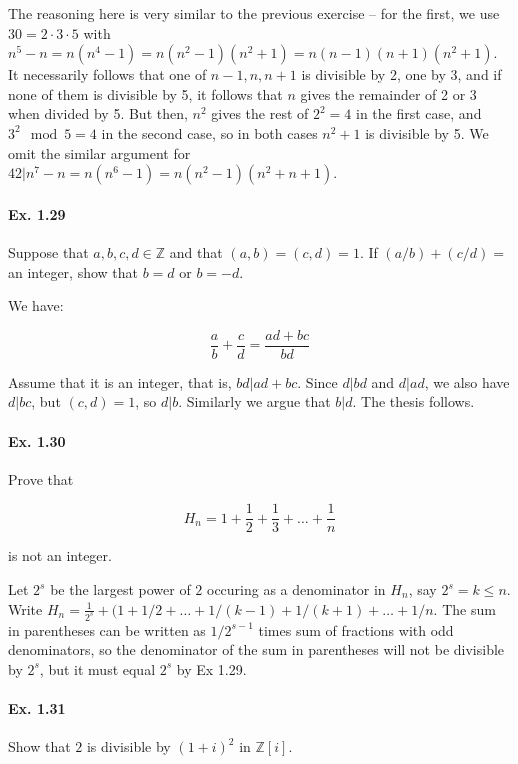 \documentclass[notitlepage]{article}
\theoremstyle{definition}
\newcommand\Z{\mathbb{Z}}
\begin{document}
The reasoning here is very similar to the previous exercise -- for the
first, we use $30 = 2\cdot3\cdot5$ with $n^5 - n = n(n^4 - 1) =
n(n^2-1)(n^2+1) = n(n-1)(n+1)(n^2 + 1)$. It necessarily follows that
one of $n-1, n, n+1$ is divisible by 2, one by 3, and if none of them
is divisible by 5, it follows that $n$ gives the remainder of 2 or 3
when divided by 5. But then, $n^2$ gives the rest of $2^2 = 4$ in the
first case, and $3^2 \mod 5 = 4$ in the second case, so in both cases
$n^2 + 1$ is divisible by 5. We omit the similar argument for $42| n^7
- n = n(n^6-1) = n(n^2 - 1)(n^2 + n + 1)$.

\paragraph{Ex. 1.29}
Suppose that $a, b, c, d \in \Z$ and that $(a, b) = (c, d) =
1$. If $(a/b) + (c/d) =$ an integer, show that $b = d$ or $b = -d$.

We have:

\begin{equation}
  \frac{a}{b} + \frac{c}{d} = \frac{ad + bc}{bd}
\end{equation}

Assume that it is an integer, that is, $bd | ad + bc$. Since $d|bd$
and $d|ad$, we also have $d|bc$, but $(c, d) = 1$, so $d|b$. Similarly
we argue that $b|d$. The thesis follows.

\paragraph{Ex. 1.30}
Prove that

\begin{equation}
  H_n = 1+ \frac{1}{2} + \frac{1}{3} + \ldots + \frac{1}{n}
\end{equation}

is not an integer.

Let $2^s$ be the largest power of $2$ occuring as a denominator in
$H_n$, say $2^s = k \leq n$. Write $H_n = \frac{1}{2^s} + (1 + 1/2 +
\ldots + 1/(k-1) + 1/(k+1) + \ldots + 1/n$. The sum in parentheses can
be written as $1/2^{s-1}$ times sum of fractions with odd
denominators, so the denominator of the sum in parentheses will not be
divisible by $2^s$, but it must equal $2^s$ by Ex 1.29.

\paragraph{Ex. 1.31}
Show that $2$ is divisible by $(1+i)^2$ in $\Z[i]$.
\end{document}
